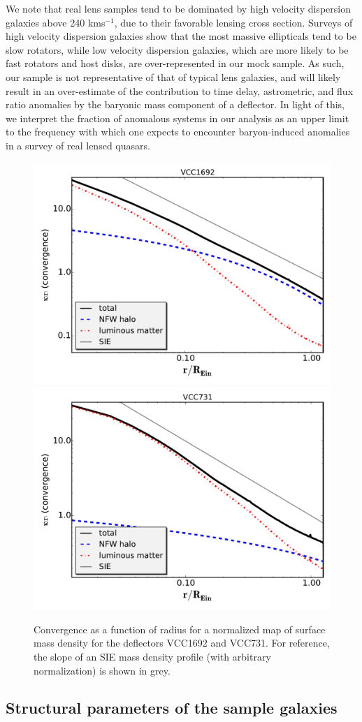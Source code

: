 We note that real lens samples tend to be dominated by high velocity dispersion galaxies above 240 kms$^{-1}$\citep{Auger++10,Son++13a}, due to their favorable lensing cross section. Surveys of high velocity dispersion galaxies \citep{Goulding++16} show that the most massive ellipticals tend to be slow rotators, while low velocity dispersion galaxies, which are more likely to be fast rotators and host disks, are over-represented in our mock sample. As such, our sample is not representative of that of typical lens galaxies, and will likely result in an over-estimate of the contribution to time delay, astrometric, and flux ratio anomalies by the baryonic mass component of a deflector. In light of this, we interpret the fraction of anomalous systems in our analysis as an upper limit to the frequency with which one expects to encounter baryon-induced anomalies in a survey of real lensed quasars.
\begin{figure}
	\centering
	{\includegraphics[trim=0.25cm 0.6cm 0cm
		0cm,clip,width=.48\textwidth]{./figures_sls/VCC1692r_vs_kap-eps-converted-to.pdf}}
	{\includegraphics[trim=0cm .6cm 0cm
		0cm,clip,width=.48\textwidth]{./figures_sls/VCC731r_vs_kap-eps-converted-to.pdf}}
	\caption[Convergence as a function of radius for VCC1692 and VCC731]{\label{fig:r_vs_kap}Convergence as a function of radius for a normalized map of surface mass density for the deflectors VCC1692 and VCC731. For reference, the slope of an SIE mass density profile (with arbitrary normalization) is shown in grey.}
\end{figure} 
\subsection{Structural parameters of the sample galaxies}
\label{sect:lenses}

